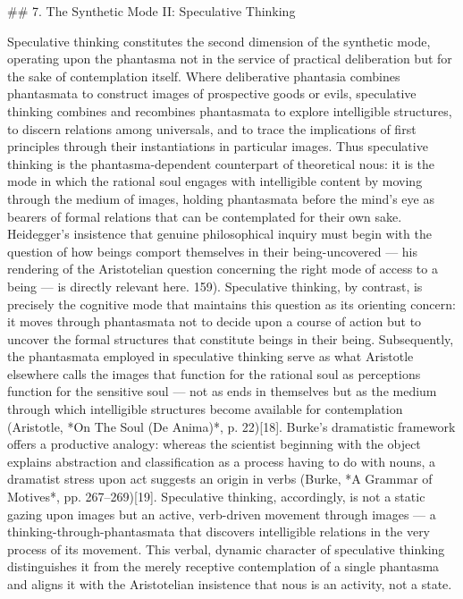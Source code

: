 ## 7. The Synthetic Mode II: Speculative Thinking

Speculative thinking constitutes the second dimension of the synthetic mode, operating upon the phantasma not in the service of practical deliberation but for the sake of contemplation itself. Where deliberative phantasia combines phantasmata to construct images of prospective goods or evils, speculative thinking combines and recombines phantasmata to explore intelligible structures, to discern relations among universals, and to trace the implications of first principles through their instantiations in particular images. Thus speculative thinking is the phantasma-dependent counterpart of theoretical nous: it is the mode in which the rational soul engages with intelligible content by moving through the medium of images, holding phantasmata before the mind's eye as bearers of formal relations that can be contemplated for their own sake. Heidegger's insistence that genuine philosophical inquiry must begin with the question of how beings comport themselves in their being-uncovered — his rendering of the Aristotelian question concerning the right mode of access to a being — is directly relevant here. 159). Speculative thinking, by contrast, is precisely the cognitive mode that maintains this question as its orienting concern: it moves through phantasmata not to decide upon a course of action but to uncover the formal structures that constitute beings in their being. Subsequently, the phantasmata employed in speculative thinking serve as what Aristotle elsewhere calls the images that function for the rational soul as perceptions function for the sensitive soul — not as ends in themselves but as the medium through which intelligible structures become available for contemplation (Aristotle, *On The Soul (De Anima)*, p. 22)[18]. Burke's dramatistic framework offers a productive analogy: whereas the scientist beginning with the object explains abstraction and classification as a process having to do with nouns, a dramatist stress upon act suggests an origin in verbs (Burke, *A Grammar of Motives*, pp. 267–269)[19]. Speculative thinking, accordingly, is not a static gazing upon images but an active, verb-driven movement through images — a thinking-through-phantasmata that discovers intelligible relations in the very process of its movement. This verbal, dynamic character of speculative thinking distinguishes it from the merely receptive contemplation of a single phantasma and aligns it with the Aristotelian insistence that nous is an activity, not a state. 

